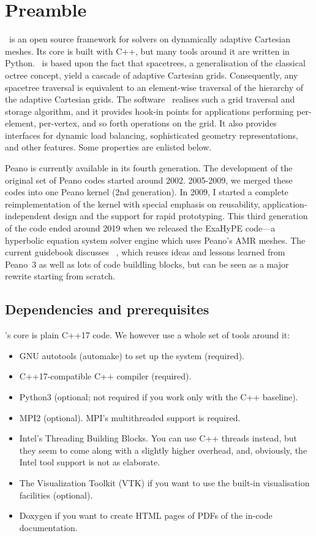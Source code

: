 \chapter{Preamble}


\Peano\ is an open source framework for solvers on dynamically adaptive
Cartesian meshes.
Its core is built with C++, but many tools around it are written in Python.
\Peano\  is based upon the fact that spacetrees, a generalisation of the classical octree concept, yield a cascade of adaptive Cartesian grids. Consequently, any spacetree traversal is equivalent to an element-wise traversal of the hierarchy of the adaptive Cartesian grids. The software \Peano\  realises such a grid traversal and storage algorithm, and it provides hook-in points for applications performing per-element, per-vertex, and so forth operations on the grid. It also provides interfaces for dynamic load balancing, sophisticated geometry representations, and other features. Some properties are enlisted below.

Peano is currently available in its fourth generation. 
The development of the original set of Peano codes started around 2002.
2005-2009, we merged these codes into one Peano kernel (2nd generation). 
In 2009, I started a complete reimplementation of the kernel with special
emphasis on reusability, application-independent design and the support for rapid prototyping. 
This third generation of the code ended around 2019 when we released the
ExaHyPE code---a hyperbolic equation system solver engine which uses Peano's
AMR meshes.
The current guidebook discusses \Peano\ , which reuses ideas and lessons learned
from Peano~3 as well as lots of code buildling blocks, but can be seen as a
major rewrite starting from scratch.


\section*{Dependencies and prerequisites}

\Peano's core is plain C++17 code. 
We however use a whole set of tools around it:

\begin{itemize}
  \item GNU autotools (automake) to set up the system (required).
  \item C++17-compatible C++ compiler (required).
  \item Python3 (optional; not required if you work only with the C++
  baseline).
  \item MPI2 (optional). MPI's multithreaded support is required.
  \item Intel's Threading Building Blocks. You can use C++ threads instead,
  but they seem to come along with a slightly higher overhead, and, obviously,
  the Intel tool support is not as elaborate.
  \item The Visualization Toolkit (VTK) if you want to use the built-in
  visualisation facilities (optional).
  \item Doxygen if you want to create HTML pages of PDFs of the in-code
  documentation.
\end{itemize}

